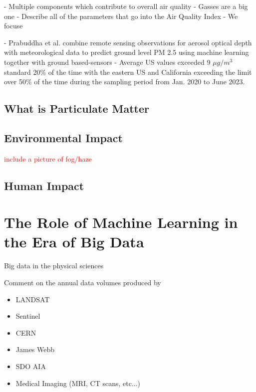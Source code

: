 - Multiple components which contribute to overall air quality
- Gasses are a big one
- Describe all of the parameters that go into the Air Quality Index
- We focuse

- Prabuddha et al. combine remote sensing observations for aerosol optical depth
with meteorological data to predict ground level PM 2.5 using machine learning
together with ground based-sensors \cite{prabuddha-pm-satellite}
- Average US values exceeded 9 $\mu g/m^3$ standard 20\% of the time with the
eastern US and California exceeding the limit over 50\% of the time during the
sampling period from Jan. 2020 to June 2023.

\subsection{What is Particulate Matter}

\subsection{Environmental Impact}

\textcolor{red}{include a picture of fog/haze}

\subsection{Human Impact}







\section{The Role of Machine Learning in the Era of Big Data}

Big data in the physical sciences

Comment on the annual data volumes produced by
\begin{itemize}
  \item LANDSAT
  \item Sentinel
  \item CERN
  \item James Webb
  \item SDO AIA
  \item Medical Imaging (MRI, CT scans, etc...)
\end{itemize}

